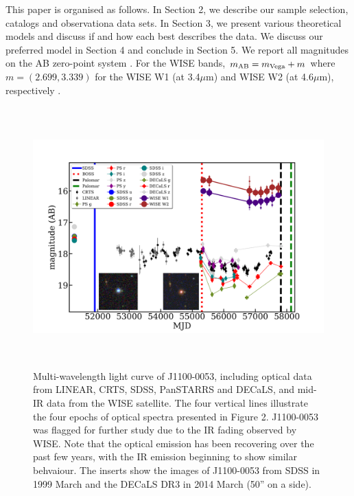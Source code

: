\documentclass[a4paper,fleqn,usenatbib]{mnras}
\begin{document}
This paper is organised as follows.  In Section 2, we describe our
sample selection, catalogs and observationa data sets.  In Section 3,
we present various theoretical models and discuss if and how each best
describes the data.  We discuss our preferred model in Section 4 and
conclude in Section 5.  We report all magnitudes on the AB zero-point
system \citep{Oke_Gunn1983, Fukugita1996}.  For the WISE bands,
$m_{\rm AB} = m_{\rm Vega} + m$ where $m = (2.699, 3.339)$ for the
WISE W1 (at 3.4$\mu$m) and WISE W2 (at 4.6$\mu$m), respectively
\citep{Cutri2011}.


\begin{figure}
  \centering
  \includegraphics[width=16.00cm, height=10.00cm, trim=0.0cm 0.0cm 0.0cm 0.0cm, clip]
  {../plots/lc/J110057_lc_20180222v1.png}
  \caption[]{
    Multi-wavelength light curve of J1100-0053, including optical data
    from LINEAR, CRTS, SDSS, PanSTARRS and DECaLS, and mid-IR data from
    the WISE satellite.  The four vertical lines illustrate the four
    epochs of optical spectra presented in Figure 2.  J1100-0053 was
    flagged for further study due to the IR fading observed by WISE.  Note
    that the optical emission has been recovering over the past few years,
    with the IR emission beginning to show similar behvaiour. The inserts
    show the images of J1100-0053 from SDSS in 1999 March and the DECaLS DR3
    in 2014 March (50'' on a side). }
  \label{fig:J110057_LC_CRTS}
\end{figure}
\end{document}
